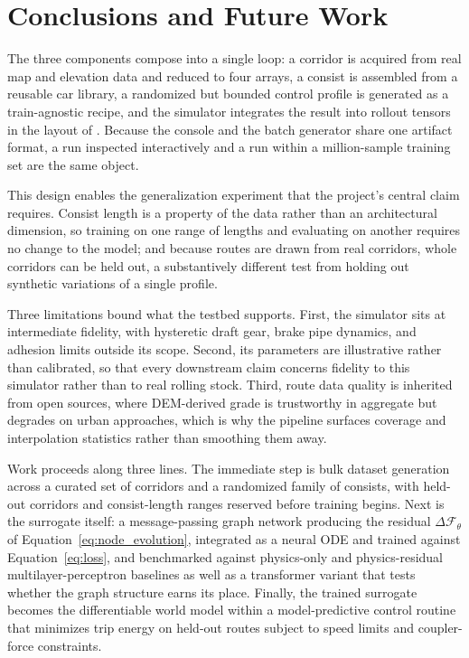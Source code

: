 \documentclass[numbered]{trbunofficial}
\begin{document}
\section{Conclusions and Future Work}\label{sec:conclusion}

The three components compose into a single loop: a corridor is acquired from real map and elevation data and reduced to four arrays, a consist is assembled from a reusable car library, a randomized but bounded control profile is generated as a train-agnostic recipe, and the simulator integrates the result into rollout tensors in the layout of . Because the console and the batch generator share one artifact format, a run inspected interactively and a run within a million-sample training set are the same object.

This design enables the generalization experiment that the project's central claim requires. Consist length is a property of the data rather than an architectural dimension, so training on one range of lengths and evaluating on another requires no change to the model; and because routes are drawn from real corridors, whole corridors can be held out, a substantively different test from holding out synthetic variations of a single profile.

Three limitations bound what the testbed supports. First, the simulator sits at intermediate fidelity, with hysteretic draft gear, brake pipe dynamics, and adhesion limits outside its scope. Second, its parameters are illustrative rather than calibrated, so that every downstream claim concerns fidelity to this simulator rather than to real rolling stock. Third, route data quality is inherited from open sources, where DEM-derived grade is trustworthy in aggregate but degrades on urban approaches, which is why the pipeline surfaces coverage and interpolation statistics rather than smoothing them away.

Work proceeds along three lines. The immediate step is bulk dataset generation across a curated set of corridors and a randomized family of consists, with held-out corridors and consist-length ranges reserved before training begins. Next is the surrogate itself: a message-passing graph network producing the residual $\Delta\mathcal{F}_\theta$ of Equation~\ref{eq:node_evolution}, integrated as a neural ODE and trained against Equation~\ref{eq:loss}, and benchmarked against physics-only and physics-residual multilayer-perceptron baselines as well as a transformer variant that tests whether the graph structure earns its place. Finally, the trained surrogate becomes the differentiable world model within a model-predictive control routine that minimizes trip energy on held-out routes subject to speed limits and coupler-force constraints.
\end{document}
